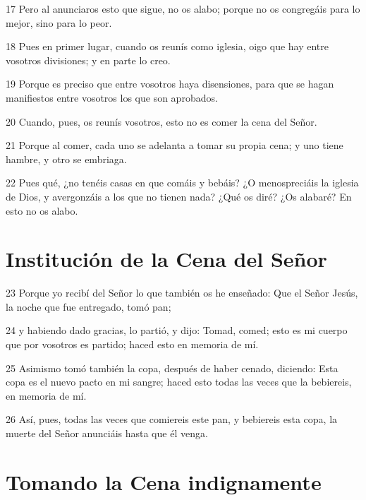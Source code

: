 \par 17 Pero al anunciaros esto que sigue, no os alabo; porque no os congregáis para lo mejor, sino para lo peor.
\par 18 Pues en primer lugar, cuando os reunís como iglesia, oigo que hay entre vosotros divisiones; y en parte lo creo.
\par 19 Porque es preciso que entre vosotros haya disensiones, para que se hagan manifiestos entre vosotros los que son aprobados.
\par 20 Cuando, pues, os reunís vosotros, esto no es comer la cena del Señor.
\par 21 Porque al comer, cada uno se adelanta a tomar su propia cena; y uno tiene hambre, y otro se embriaga.
\par 22 Pues qué, ¿no tenéis casas en que comáis y bebáis? ¿O menospreciáis la iglesia de Dios, y avergonzáis a los que no tienen nada? ¿Qué os diré? ¿Os alabaré? En esto no os alabo.

\section*{Institución de la Cena del Señor}

\par 23 Porque yo recibí del Señor lo que también os he enseñado: Que el Señor Jesús, la noche que fue entregado, tomó pan;
\par 24 y habiendo dado gracias, lo partió, y dijo: Tomad, comed; esto es mi cuerpo que por vosotros es partido; haced esto en memoria de mí.
\par 25 Asimismo tomó también la copa, después de haber cenado, diciendo: Esta copa es el nuevo pacto en mi sangre; haced esto todas las veces que la bebiereis, en memoria de mí.
\par 26 Así, pues, todas las veces que comiereis este pan, y bebiereis esta copa, la muerte del Señor anunciáis hasta que él venga.

\section*{Tomando la Cena indignamente}

